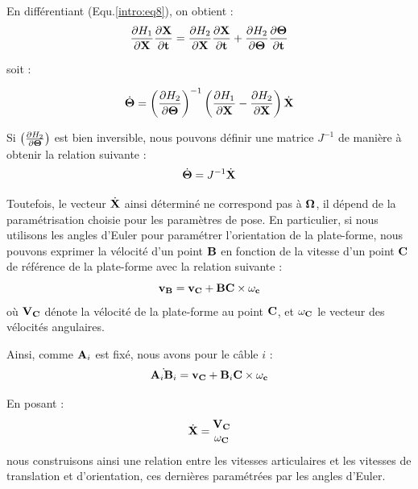 En différentiant (Equ.\ref{intro:eq8}), on obtient :
\begin{equation}
\frac{\partial H_1}{\partial {\bf X}} \frac{\partial {\bf X}}{\partial {\bf t}} 
=  \frac{\partial H_2}{\partial {\bf X}} \frac{\partial {\bf X}}{\partial {\bf 
t}} + \frac{\partial H_2}{\partial {\bf \Theta}} \frac{\partial {\bf 
\Theta}}{\partial {\bf t}}
\label{intro:eq9}
\end{equation}

soit :

\begin{equation}
\dot {\bf \Theta} = \left ( \frac{\partial H_2}{\partial {\bf \Theta}} \right 
)^{-1} \left (\frac{\partial H_1}{\partial {\bf X}} - \frac{\partial 
H_2}{\partial {\bf X}} \right ) \dot {\bf X}
\label{intro:eq10}
\end{equation}

Si $\left ( \frac{\partial H_2}{\partial {\bf \Theta}} \right )$ est bien 
inversible, nous pouvons définir une matrice $J^{-1}$ de manière à obtenir la 
relation suivante :
\begin{equation}
\dot {\bf \Theta} = J^{-1} \dot {\bf X}
\label{intro:eq11}
\end{equation}

Toutefois, le vecteur $\dot {\bf X}$ ainsi d\'etermin\'e ne correspond pas \`a 
$\bf \Omega$, il d\'epend de la param\'etrisation choisie pour les param\`etres 
de pose. En particulier, si nous utilisons les angles d'Euler pour param\'etrer 
l'orientation de la plate-forme, nous pouvons exprimer la v\'elocit\'e d'un 
point ${\bf B}$ en fonction de la vitesse d'un point ${\bf C}$ de r\'ef\'erence 
de la plate-forme avec la relation suivante :
\begin{equation}
{\bf v_B} = {\bf v_C} + {\bf BC} \times {\bf \omega_c}
\label{intro:eq11b}
\end{equation}
o\`u $\bf V_C$ d\'enote la v\'elocit\'e de la plate-forme au point ${\bf C}$, 
et ${\bf \omega_C}$ le vecteur des v\'elocit\'es angulaires.

Ainsi, comme ${\bf A}_i$ est fix\'e, nous avons pour le c\^able $i$ :
\begin{equation}
\dot { {\bf A}_i{\bf B}_i } = {\bf v_C} + {\bf B}_i{\bf C} \times {\bf \omega_c}
\label{intro:eq11c}
\end{equation}

En posant :
\begin{equation}
\dot {\bf X} = \begin{matrix}
                {\bf V_C} \\
		{\bf \omega_C}
               \end{matrix}
\label{intro:eq11d}
\end{equation}
nous construisons ainsi une relation entre les vitesses articulaires et les 
vitesses de translation et d'orientation, ces derni\`eres param\'etr\'ees par 
les angles d'Euler.

